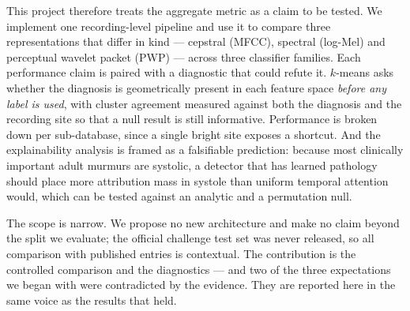 This project therefore treats the aggregate metric as a claim to be tested. We
implement one recording-level pipeline and use it to compare three
representations that differ in kind --- cepstral (MFCC), spectral (log-Mel) and
perceptual wavelet packet (PWP) --- across three classifier families. Each
performance claim is paired with a diagnostic that could refute it. $k$-means
asks whether the diagnosis is geometrically present in each feature space
\emph{before any label is used}, with cluster agreement measured against both
the diagnosis and the recording site so that a null result is still informative.
Performance is broken down per sub-database, since a single bright site exposes
a shortcut. And the explainability analysis is framed as a falsifiable
prediction: because most clinically important adult murmurs are systolic, a
detector that has learned pathology should place more attribution mass in
systole than uniform temporal attention would, which can be tested against an
analytic and a permutation null.

The scope is narrow. We propose no new architecture and make no claim beyond the
split we evaluate; the official challenge test set was never released, so all
comparison with published entries is contextual. The contribution is the
controlled comparison and the diagnostics --- and two of the three expectations
we began with were contradicted by the evidence. They are reported here in the
same voice as the results that held.
